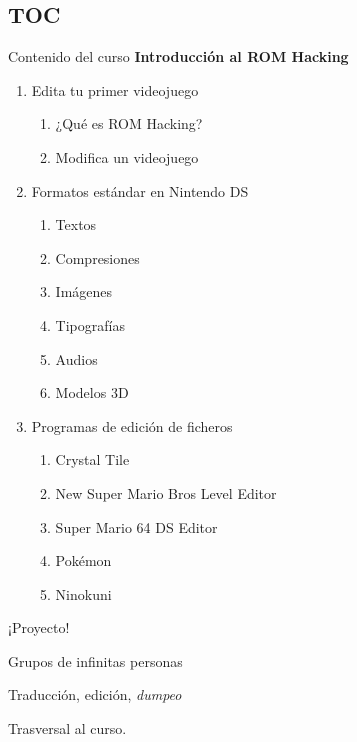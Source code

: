 \subsection{TOC}
\begin{frame}{Contenido del curso}
    \centering
    \textbf{Introducción al ROM Hacking}
    \begin{enumerate}
        \item Edita tu primer videojuego
        \begin{enumerate}
            \item ¿Qué es ROM Hacking?
            \item Modifica un videojuego
        \end{enumerate}
        \item Formatos estándar en Nintendo DS
        \begin{enumerate}
            \item Textos
            \item Compresiones
            \item Imágenes
            \item Tipografías
            \item Audios
            \item Modelos 3D
        \end{enumerate}
        \item Programas de edición de ficheros
        \begin{enumerate}
            \item Crystal Tile
            \item New Super Mario Bros Level Editor
            \item Super Mario 64 DS Editor
            \item Pokémon
            \item Ninokuni
        \end{enumerate}
    \end{enumerate}
\end{frame}

\begin{frame}{¡Proyecto!}
    \Large
    \begin{wideitemize}
        \item Grupos de infinitas personas
        \item Traducción, edición, \textit{dumpeo}
        \item Trasversal al curso.
    \end{wideitemize}
\end{frame}

